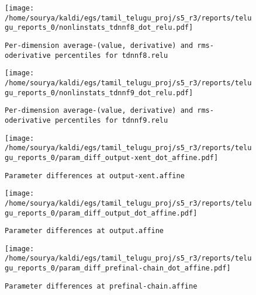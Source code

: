 \documentclass[prl,10pt,twocolumn]{revtex4}
\begin{document}
\newpage
\begin{figure}[h]
  \begin{center}
    \caption{\texttt{Per-dimension average-(value, derivative) and rms-oderivative percentiles for tdnnf8.relu}}
    \texttt{[image: /home/sourya/kaldi/egs/tamil\_telugu\_proj/s5\_r3/reports/telugu\_reports\_0/nonlinstats\_tdnnf8\_dot\_relu.pdf]}
  \end{center}
\end{figure}
\clearpage


\newpage
\begin{figure}[h]
  \begin{center}
    \caption{\texttt{Per-dimension average-(value, derivative) and rms-oderivative percentiles for tdnnf9.relu}}
    \texttt{[image: /home/sourya/kaldi/egs/tamil\_telugu\_proj/s5\_r3/reports/telugu\_reports\_0/nonlinstats\_tdnnf9\_dot\_relu.pdf]}
  \end{center}
\end{figure}
\clearpage


\newpage
\begin{figure}[h]
  \begin{center}
    \caption{\texttt{Parameter differences at output-xent.affine}}
    \texttt{[image: /home/sourya/kaldi/egs/tamil\_telugu\_proj/s5\_r3/reports/telugu\_reports\_0/param\_diff\_output-xent\_dot\_affine.pdf]}
  \end{center}
\end{figure}
\clearpage


\newpage
\begin{figure}[h]
  \begin{center}
    \caption{\texttt{Parameter differences at output.affine}}
    \texttt{[image: /home/sourya/kaldi/egs/tamil\_telugu\_proj/s5\_r3/reports/telugu\_reports\_0/param\_diff\_output\_dot\_affine.pdf]}
  \end{center}
\end{figure}
\clearpage


\newpage
\begin{figure}[h]
  \begin{center}
    \caption{\texttt{Parameter differences at prefinal-chain.affine}}
    \texttt{[image: /home/sourya/kaldi/egs/tamil\_telugu\_proj/s5\_r3/reports/telugu\_reports\_0/param\_diff\_prefinal-chain\_dot\_affine.pdf]}
  \end{center}
\end{figure}
\clearpage
\end{document}
